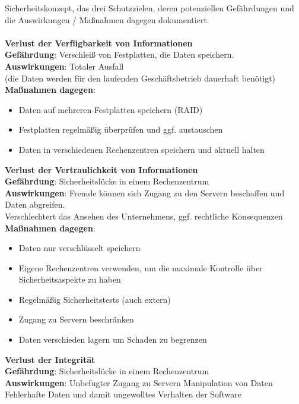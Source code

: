 \documentclass[asp1.tex]{subfiles}
\begin{document}
Sicherheitskonzept, das drei Schutzzielen, deren potenziellen Gefährdungen und die Auswirkungen / Maßnahmen dagegen dokumentiert. \\
\\
\textbf{Verlust der Verfügbarkeit von Informationen} \\
\textbf{Gefährdung}: Verschleiß von Festplatten, die Daten speichern.\\
\textbf{Auswirkungen}: Totaler Ausfall \\ (die Daten werden für den laufenden Geschäftsbetrieb dauerhaft benötigt) \\
\textbf{Maßnahmen dagegen}:
\begin{itemize}
    \item Daten auf mehreren Festplatten speichern (RAID)
    \item Festplatten regelmäßig überprüfen und ggf. austauschen
    \item Daten in verschiedenen Rechenzentren speichern und aktuell halten
\end{itemize}
\vspace{1cm}
\textbf{Verlust der Vertraulichkeit von Informationen} \\
\textbf{Gefährdung}: Sicherheitslücke in einem Rechenzentrum \\
\textbf{Auswirkungen}: Fremde können sich Zugang zu den Servern beschaffen und Daten abgreifen. \\
Verschlechtert das Ansehen des Unternehmens, ggf. rechtliche Konsequenzen \\
\textbf{Maßnahmen dagegen}:
\begin{itemize}
    \item Daten nur verschlüsselt speichern
    \item Eigene Rechenzentren verwenden, um die maximale Kontrolle über Sicherheitsaspekte zu haben
    \item Regelmäßig Sicherheitstests (auch extern)
    \item Zugang zu Servern beschränken
    \item Daten verschieden lagern um Schaden zu begrenzen
\end{itemize}
\vspace{1cm}
\textbf{Verlust der Integrität} \\
\textbf{Gefährdung}: Sicherheitslücke in einem Rechenzentrum \\
\textbf{Auswirkungen}: Unbefugter Zugang zu Servern Manipulation von Daten \\
Fehlerhafte Daten und damit ungewolltes Verhalten der Software \\
\end{document}

